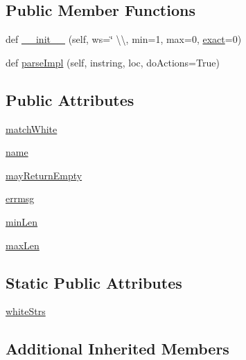 \subsection*{Public Member Functions}
\begin{DoxyCompactItemize}
\item 
def \hyperlink{classpyparsing_1_1White_a60dfd63cad0269fe03e48285adae8a0e}{\+\_\+\+\_\+init\+\_\+\+\_\+} (self, ws=\char`\"{} \textbackslash{}\textbackslash{}, min=1, max=0, \hyperlink{namespacepyparsing_a832e22d9e8c149774782b6f58d10278f}{exact}=0)
\item 
def \hyperlink{classpyparsing_1_1White_a19903a5112dfe1489782de1b5eb17f38}{parse\+Impl} (self, instring, loc, do\+Actions=True)
\end{DoxyCompactItemize}
\subsection*{Public Attributes}
\begin{DoxyCompactItemize}
\item 
\hyperlink{classpyparsing_1_1White_a87411727ab003b8e186ff788115c3375}{match\+White}
\item 
\hyperlink{classpyparsing_1_1White_aea4e1daf5f2f94e4026c1f6ee0c016c3}{name}
\item 
\hyperlink{classpyparsing_1_1White_a818010ae6793935ec4c1214f8ae0378d}{may\+Return\+Empty}
\item 
\hyperlink{classpyparsing_1_1White_a9150e9ec11877469f9f8ea269f85eb99}{errmsg}
\item 
\hyperlink{classpyparsing_1_1White_a29e30593de6fa744bd018de0828eda01}{min\+Len}
\item 
\hyperlink{classpyparsing_1_1White_ac0faf8c3ed0bb9edd1610025b3d05c86}{max\+Len}
\end{DoxyCompactItemize}
\subsection*{Static Public Attributes}
\begin{DoxyCompactItemize}
\item 
\hyperlink{classpyparsing_1_1White_aab60a28cd04c1b3ffc19d81685643d7f}{white\+Strs}
\end{DoxyCompactItemize}
\subsection*{Additional Inherited Members}


